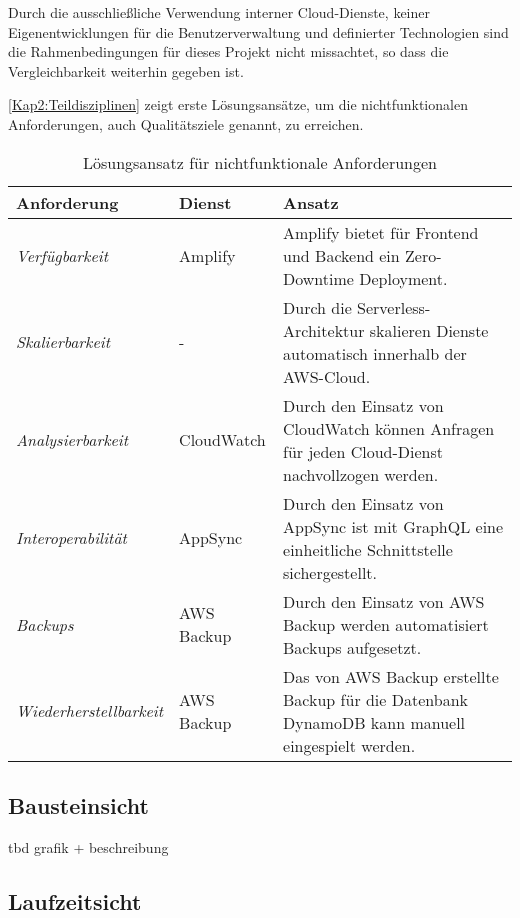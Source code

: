 Durch die ausschließliche Verwendung interner Cloud-Dienste, keiner Eigenentwicklungen für die Benutzerverwaltung und definierter Technologien sind die Rahmenbedingungen für dieses Projekt nicht missachtet, so dass die Vergleichbarkeit weiterhin gegeben ist.

\autoref{Kap2:Teildisziplinen} zeigt erste Lösungsansätze, um die nichtfunktionalen Anforderungen, auch Qualitätsziele genannt, zu erreichen.

\begin{table}[h]
  \caption{Lösungsansatz für nichtfunktionale Anforderungen}
  \label{Kap2:Teildisziplinen}
  \renewcommand{\arraystretch}{1.2}
  \centering
  \sffamily
  \begin{footnotesize}
    \begin{tabularx}{0.9\textwidth}{l l X}
      \toprule
      \textbf{Anforderung} & \textbf{Dienst} & \textbf{Ansatz}\\
      \midrule
        \emph{Verfügbarkeit} & Amplify & Amplify bietet für Frontend und Backend ein Zero-Downtime Deployment. \\
        \emph{Skalierbarkeit} & - & Durch die Serverless-Architektur skalieren Dienste automatisch innerhalb der \ac{AWS}-Cloud.\\
        \emph{Analysierbarkeit} & CloudWatch & Durch den Einsatz von CloudWatch können Anfragen für jeden Cloud-Dienst nachvollzogen werden.\\
        \emph{Interoperabilität} & AppSync & Durch den Einsatz von AppSync ist mit GraphQL eine einheitliche Schnittstelle sichergestellt.\\
        \emph{Backups} & AWS Backup & Durch den Einsatz von AWS Backup werden automatisiert Backups aufgesetzt.\\
        \emph{Wiederherstellbarkeit} & AWS Backup &  Das von AWS Backup erstellte Backup für die Datenbank DynamoDB kann manuell eingespielt werden.\\
      \bottomrule
    \end{tabularx}
  \end{footnotesize}
  \rmfamily
\end{table}

\subsection{Bausteinsicht}

tbd grafik + beschreibung

\subsection{Laufzeitsicht}

